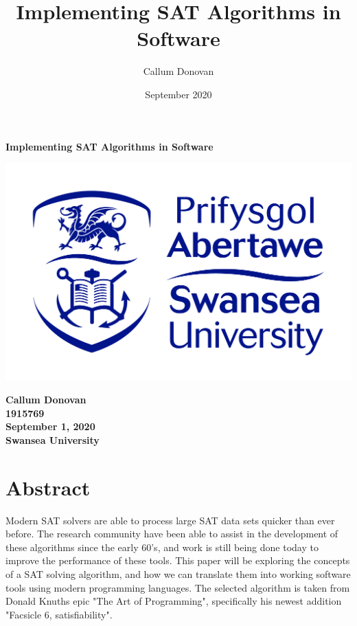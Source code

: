 \documentclass{article}
\title{\bfseries Implementing SAT Algorithms in Software}
\author{Callum Donovan}
\date{September 2020}
\begin{document}
\begin{titlepage}
    \begin{center}
        \Large{\bfseries Implementing SAT Algorithms in Software} \\
        \vspace{4cm}
        \begin{center}
            \includegraphics[scale=0.2]{swan.jpg}
        \end{center}
        \vspace*{\fill}
        \bfseries{\large Callum Donovan \\
            1915769 \\
            September 1, 2020 \\
            Swansea University \\}
    \end{center}
\end{titlepage}

\section{Abstract}
Modern SAT solvers are able to process large SAT data sets quicker than ever before. The research community have been able to assist in the
development of these algorithms since the early 60's, and work is still being done today to improve the performance of these tools. This
paper will be exploring the concepts of a SAT solving algorithm, and how we can translate them into working software tools using modern
programming languages. The selected algorithm is taken from Donald Knuths epic "The Art of Programming", specifically his newest addition "Facsicle 6,
satisfiability".
\end{document}
